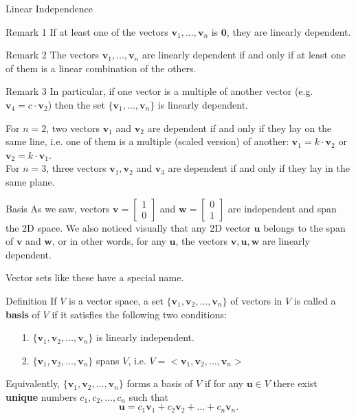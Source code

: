 \documentclass{beamer}
\newcommand{\vv}{\mathbf{v}}
\newcommand{\vu}{\mathbf{u}}
\newcommand{\vw}{\mathbf{w}}
\begin{document}
\begin{frame}{Linear Independence}
    \begin{block}{Remark 1}
        If at least one of the vectors $\vv_1,\dots,\vv_n$ is $\textbf{0}$, they are linearly dependent.
    \end{block}
\pause
    \begin{block}{Remark 2}
The vectors $\vv_1,\dots,\vv_n$ are linearly dependent if and only if at least
one of them is a linear combination of the others.
    \end{block}
\pause
    \begin{block}{Remark 3}
        In particular, if one
vector is a multiple of another vector (e.g. $\vv_4=c\cdot \vv_2$) then the
set $\{\vv_1,\dots,\vv_n\}$ is linearly dependent.
    \end{block}
\pause
For $n=2$, two vectors $\vv_1$ and $\vv_2$ are dependent if and only if they lay on the same line, i.e. one of them is a multiple (scaled version) of another: $\vv_1=k\cdot \vv_2$ or $\vv_2=k\cdot \vv_1$. 
\pause \\

For $n=3$, three vectors $\vv_1, \vv_2$ and $\vv_3$ are dependent if and only if they lay in the same plane.

\end{frame}


\begin{frame}{Basis}
As we saw, vectors $\vv=\begin{bmatrix}
    1\\0
\end{bmatrix}$ and $\vw=\begin{bmatrix}
    0\\1
\end{bmatrix}$ are independent and span the 2D space. We also noticed visually that any 2D vector $\vu$ belongs to the span of $\vv$ and $\vw$\pause, or in other words, for any $\vu$, the vectors $\vv, \vu, \vw$ are linearly dependent. \pause

Vector sets like these have a special name.

    \begin{block}{Definition}
        If $V$ is a vector space, a set $\{\vv_1,\vv_2,\dots,\vv_n\}$ of vectors in $V$ is called a \textbf{basis} of $V$ if it satisfies the following two conditions:
        \begin{enumerate}
            \item[1.] $\{\vv_1,\vv_2,\dots,\vv_n\}$ is linearly independent.
            
            \item[2.] $\{\vv_1,\vv_2,\dots,\vv_n\}$ spans $V$, i.e. $V=<\vv_1,\vv_2,\dots,\vv_n>$
        \end{enumerate}
    \end{block}

\pause 

Equivalently, $\{\vv_1,\vv_2,\dots,\vv_n\}$ forms a basis of $V$ if for any $\vu \in V$ there exist \textbf{unique} numbers $c_1,c_2,\dots,c_n$ such that
\[\vu = c_1\vv_1+c_2\vv_2+\dots+c_n\vv_n.\]

\end{frame}
\end{document}
